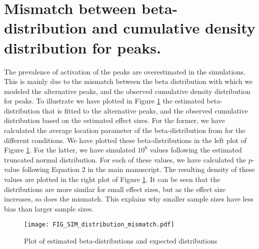 \section{Mismatch between beta-distribution and cumulative density distribution for peaks.\label{mismatch}}

The prevalence of activation of the peaks are overestimated in the simulations.  This is mainly due to the mismatch between the beta distribution with which we modeled the alternative peaks, and the observed cumulative density distribution for peaks.  To illustrate we have plotted in Figure \ref{fig.mismatch} the estimated beta-distribution that is fitted to the alternative peaks, and the observed cumulative distribution based on the estimated effect sizes.
For the former, we have calculated the average location parameter of the beta-distribution from \citet{Pounds2004} for the different conditions.  We have plotted these beta-distributions in the left plot of Figure \ref{fig.mismatch}.
For the latter, we have simulated $10^8$ values following the estimated truncated normal distribution.  For each of these values, we have calculated the $p$-value following Equation 2 in the main manuscript.  The resulting density of these values are plotted in the right plot of Figure \ref{fig.mismatch}.
It can be seen that the distributions are more similar for small effect sizes, but as the effect size increases, so does the mismatch.  This explains why smaller sample sizes have less bias than larger sample sizes.

\begin{center}
\begin{figure}
  \texttt{[image: FIG\_SIM\_distribution\_mismatch.pdf]}
  \caption{Plot of estimated beta-distributions and expected distributions \label{fig.mismatch}}
\end{figure}
\end{center}

